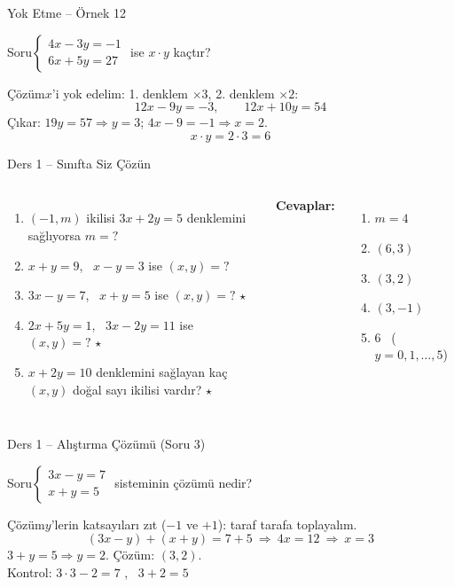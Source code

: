 \documentclass[aspectratio=169,11pt]{beamer}
\newcommand{\soru}[3]{%
\begin{frame}{#1}
  \begin{block}{Soru}\large #2\end{block}
  \pause
  \begin{exampleblock}{Çözüm}\large #3\end{exampleblock}
\end{frame}}
\begin{document}
\soru{Yok Etme -- Örnek 12}
{\(\begin{cases}4x-3y=-1\\ 6x+5y=27\end{cases}\) \quad ise \(x\cdot y\) kaçtır?}
{\(x\)'i yok edelim: 1. denklem \(\times 3\), 2. denklem \(\times 2\):
\[12x-9y=-3,\qquad 12x+10y=54\]
Çıkar: \(19y=57\Rightarrow y=3\); \quad \(4x-9=-1\Rightarrow x=2\).
\[x\cdot y=2\cdot 3=6\]}

\begin{frame}{Ders 1 -- Sınıfta Siz Çözün}
\begin{columns}[t]
\begin{enumerate}
\item \((-1,m)\) ikilisi \(3x+2y=5\) denklemini sağlıyorsa \(m=?\)
\item \(x+y=9\), \ \(x-y=3\) ise \((x,y)=?\)
\item \(3x-y=7\), \ \(x+y=5\) ise \((x,y)=?\) \(\star\)
\item \(2x+5y=1\), \ \(3x-2y=11\) ise \((x,y)=?\) \(\star\)
\item \(x+2y=10\) denklemini sağlayan kaç \((x,y)\) doğal sayı ikilisi vardır? \(\star\)
\end{enumerate}
\pause
\textbf{Cevaplar:}
\begin{enumerate}
\item \(m=4\)
\item \((6,3)\)
\item \((3,2)\)
\item \((3,-1)\)
\item \(6\) \ (\(y=0,1,\dots,5\))
\end{enumerate}
\end{columns}
\vspace{4pt}{\footnotesize \(\star\) işaretli soruların adım adım çözümü sonraki slaytlardadır.}
\end{frame}

\soru{Ders 1 -- Alıştırma Çözümü (Soru 3)}
{\(\begin{cases}3x-y=7\\ x+y=5\end{cases}\) \quad sisteminin çözümü nedir?}
{\(y\)'lerin katsayıları zıt (\(-1\) ve \(+1\)): taraf tarafa toplayalım.
\[(3x-y)+(x+y)=7+5\ \Rightarrow\ 4x=12\ \Rightarrow\ x=3\]
\(3+y=5\Rightarrow y=2\). \quad Çözüm: \((3,2)\).\\[3pt]
Kontrol: \(3\cdot 3-2=7\) \checkmark, \ \(3+2=5\) \checkmark}
\end{document}
